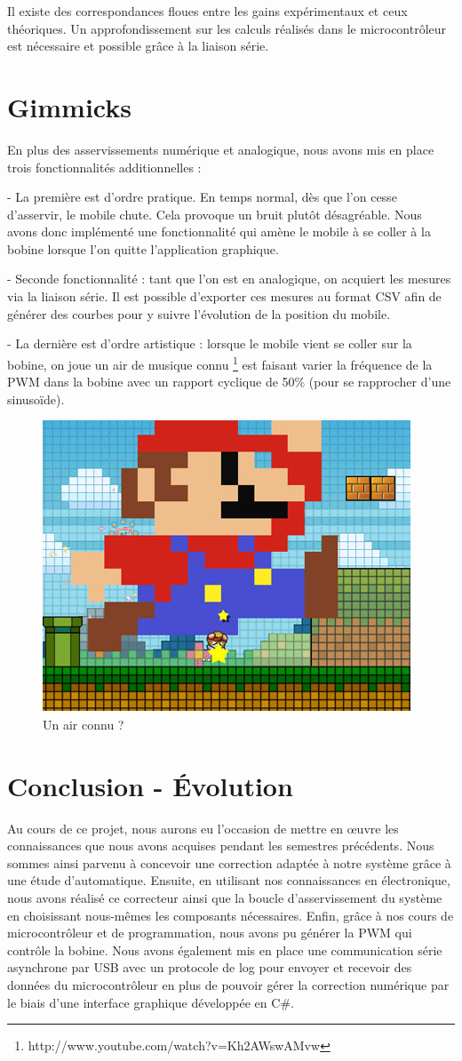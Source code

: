 \documentclass[11pt, french]{article} %
\begin{document}
Il existe des correspondances floues entre les gains expérimentaux et ceux théoriques. Un approfondissement sur les calculs réalisés dans le microcontrôleur est nécessaire et possible grâce à la liaison série.

\section{Gimmicks}
 
 En plus des asservissements numérique et analogique, nous avons mis en place trois fonctionnalités additionnelles :
 
 \medskip
 
 - La première est d'ordre pratique. En temps normal, dès que l'on cesse d'asservir, le mobile chute. Cela provoque un bruit plutôt désagréable. Nous avons donc implémenté une fonctionnalité qui amène le mobile à se coller à la bobine lorsque l'on quitte l'application graphique. 
 
 - Seconde fonctionnalité : tant que l'on est en analogique, on acquiert les mesures via la liaison série. Il est possible d'exporter ces mesures au format CSV afin de générer des courbes pour y suivre l'évolution de la position du mobile.
 
  - La dernière est d'ordre artistique : lorsque le mobile vient se coller sur la bobine, on joue un air de musique connu \footnote{http://www.youtube.com/watch?v=Kh2AWswAMvw} est faisant varier la fréquence de la PWM dans la bobine avec un rapport cyclique de 50\% (pour se rapprocher d'une sinusoïde). 
  
\begin{figure}[h!]
	\centering
	\includegraphics[width = 4 cm]{SolutionNumerique/mario.png} 
	\caption{Un air connu ?}
\end{figure}
 
 \pagebreak
\section*{Conclusion - Évolution}

Au cours de ce projet, nous aurons eu l'occasion de mettre en œuvre les connaissances que nous avons acquises pendant les semestres précédents. Nous sommes ainsi parvenu à concevoir une correction adaptée à notre système grâce à une étude d'automatique. Ensuite, en utilisant nos connaissances en électronique, nous avons réalisé ce correcteur ainsi que la boucle d'asservissement du système en choisissant nous-mêmes les composants nécessaires. Enfin, grâce à nos cours de microcontrôleur et de programmation, nous avons pu générer la PWM qui contrôle la bobine. Nous avons également mis en place une communication série asynchrone par USB avec un protocole de log pour envoyer et recevoir des données du microcontrôleur en plus de pouvoir gérer la correction numérique par le biais d'une interface graphique développée en C\#. 
\end{document}
